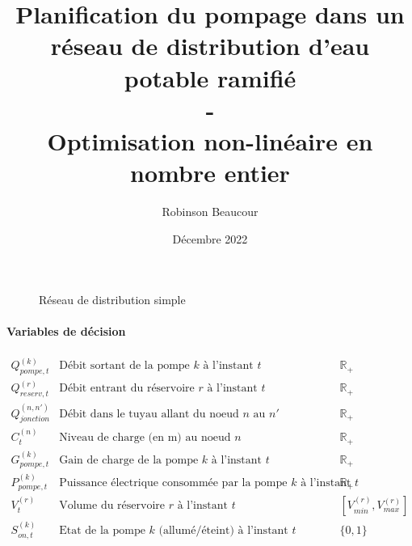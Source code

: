 \documentclass{article}
\title{Planification du pompage dans un réseau de distribution d'eau potable ramifié\\-\\Optimisation non-linéaire en nombre entier}
\author{Robinson Beaucour}
\date{Décembre 2022}
\begin{document}
\maketitle

\begin{figure}[h]
    \centering
    \caption{Réseau de distribution simple}
\end{figure}

\paragraph{Variables de décision}
$$
\left.
    \begin{array}{lll}
        Q_{pompe,t}^{(k)}       &   \text{Débit sortant de la pompe $k$ à l'instant $t$}    & \mathbb{R}_+\\[0.2cm]
        Q_{reserv,t}^{(r)}      &   \text{Débit entrant du réservoire $r$ à l'instant $t$}  & \mathbb{R}_+\\[0.2cm]
        Q_{jonction}^{(n,n')}   &   \text{Débit dans le tuyau allant du noeud $n$ au $n'$}  &   \mathbb{R}_+\\[0.2cm]
        C_t^{(n)}               &   \text{Niveau de charge (en m) au noeud $n$}             & \mathbb{R}_+\\[0.2cm]
        G_{pompe,t}^{(k)}       &   \text{Gain de charge de la pompe $k$ à l'instant $t$}   & \mathbb{R}_+\\[0.2cm]
        P_{pompe,t}^{(k)}       &   \text{Puissance électrique consommée par la pompe $k$ à l'instant $t$}& \mathbb{R}_+\\[0.2cm]
        V_t^{(r)}               &   \text{Volume du réservoire $r$ à l'instant $t$}& [V_{min}^{(r)},V_{max}^{(r)}]\\[0.2cm]
        S_{on,t}^{(k)}          &   \text{Etat de la pompe $k$ (allumé/éteint) à l'instant $t$}&\{0,1\}\\[0.2cm]
    \end{array}
\right.
$$
\end{document}
